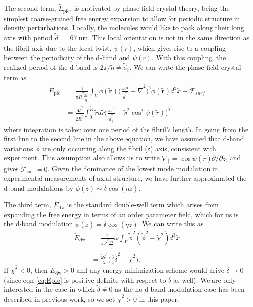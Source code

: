 \documentclass[%
 reprint,
 amsmath,amssymb,
 aps,
]{revtex4-1}
\begin{document}
The second term, $\tilde{E}_{\textrm{pfc}}$, is motivated by phase-field crystal theory, being the simplest coarse-grained free energy expansion to allow for periodic structure in density perturbations. Locally, the molecules would like to pack along their long axis with period $\tilde{d}_{\parallel}=\SI{67}{\nano\meter}$. This local orientation is not in the same direction as the fibril axis due to the local twist, $\psi(r)$, which gives rise to a coupling between the periodicity of the d-band and $\psi(r)$. With this coupling, the realized period of the d-band is $2\pi/\tilde{\eta}\neq \tilde{d}_{\parallel}$. We can write the phase-field crystal term as
\begin{align}\label{eq:Epfc}
\tilde{E}_{\textrm{pfc}}&=\frac{1}{\pi \tilde{R}^2\frac{2\pi}{\tilde{\eta}}}\int_{\tilde{V}}\tilde{\phi}(\tilde{\bm{r}})\bigg(\frac{4\pi^2}{\tilde{d}_{\parallel}^2}+\tilde{\nabla}_{\parallel}^2\bigg)^2\tilde{\phi}(\tilde{\bm{r}})d^3\tilde{x}+\tilde{\mathcal{F}}_{surf}\nonumber\\
&=\frac{\tilde{\Lambda}\tilde{\delta}^2}{2\tilde{R}^2}\int_0^{\tilde{R}}\tilde{r}d\tilde{r}\bigg(\frac{4\pi^2}{\tilde{d}_{\parallel}^2}-\tilde{\eta}^2\cos^2\psi(\tilde{r})\bigg)^2
\end{align}
where integration is taken over one period of the fibril's length. In going from the first line to the second line in the above equation, we have assumed that d-band variations $\phi$ are only occurring along the fibril (z) axis, consistent with experiment. This assumption also allows us to write $\tilde{\nabla}_{\parallel}=\cos\psi(\tilde{r})\partial/\partial \tilde{z}$, and gives $\tilde{\mathcal{F}}_{\textrm{surf}}=0$. Given the dominance of the lowest mode modulation in experimental measurements of axial structure, we have further approximated the d-band modulations by $\tilde{\phi}(\tilde{z})\sim\tilde{\delta}\cos(\tilde{\eta}\tilde{z})$.

The third term, $\tilde{E}_{\textrm{dw}}$ is the standard double-well term which arises from expanding the free energy in terms of an order parameter field, which for us is the d-band modulation $\tilde{\phi}(\tilde{z})=\tilde{\delta}\cos(\tilde{\eta}\tilde{z})$. We can write this as
\begin{align}\label{eq:Edw}
\tilde{E}_{\textrm{dw}}&=\frac{1}{\pi \tilde{R}^2\frac{2\pi}{\tilde{\eta}}}\tilde{\omega}\int_{\tilde{V}}\tilde{\phi}^2(\tilde{\phi}^2-\tilde{\chi}^2)d^3\tilde{x}\nonumber\\
&=\frac{\tilde{\omega}\tilde{\delta}^2}{2}\bigg(\frac{3}{4}\tilde{\delta}^2-\tilde{\chi}^2\bigg).
\end{align}
If $\tilde{\chi}^2<0$, then $\tilde{E}_{\textrm{dw}}>0$ and any energy minimization scheme would drive $\tilde{\delta}\to0$ (since eqn \ref{eq:Epfc} is positive definite with respect to $\delta$ as well). We are only interested in the case in which $\tilde{\delta}\neq0$ as the no d-band modulation case has been described in previous work, so we set $\tilde{\chi}^2>0$ in this paper.
\end{document}
